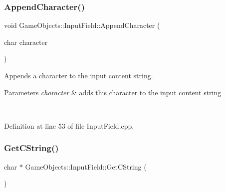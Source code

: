\subsubsection{\texorpdfstring{AppendCharacter()}{AppendCharacter()}}
{\footnotesize\ttfamily void Game\+Objects\+::\+Input\+Field\+::\+Append\+Character (\begin{DoxyParamCaption}\item[{char}]{character }\end{DoxyParamCaption})}



Appends a character to the input content string. 


\begin{DoxyParams}{Parameters}
{\em character} & adds this character to the input content string \begin{DoxyVerb}\end{DoxyVerb}
 \\
\hline
\end{DoxyParams}


Definition at line 53 of file Input\+Field.\+cpp.


\begin{DoxyCode}{0}

\end{DoxyCode}
\mbox{\label{class_game_objects_1_1_input_field_a3c18942b479df89b20f2c25001fe3b8a}} 
\subsubsection{\texorpdfstring{GetCString()}{GetCString()}}
{\footnotesize\ttfamily char $\ast$ Game\+Objects\+::\+Input\+Field\+::\+Get\+C\+String (\begin{DoxyParamCaption}{ }\end{DoxyParamCaption})}



